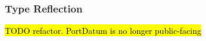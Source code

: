 


\subsubsection{Type Reflection}
\label{type_reflection}
\hl{TODO refactor. PortDatum is no longer public-facing}



